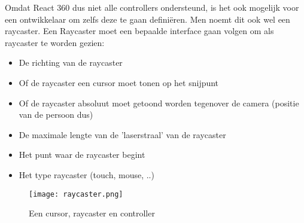 Omdat React 360 dus niet alle controllers ondersteund, is het ook mogelijk voor een ontwikkelaar om zelfs deze te gaan definiëren. Men noemt dit ook wel een raycaster. Een Raycaster moet een bepaalde interface gaan volgen om als raycaster te worden gezien:

\begin{itemize}
	\item De richting van de raycaster
	\item Of de raycaster een cursor moet tonen op het snijpunt
	\item Of de raycaster absoluut moet getoond worden tegenover de camera (positie van de persoon dus)
	\item De maximale lengte van de 'laserstraal' van de raycaster
	\item Het punt waar de raycaster begint
	\item Het type raycaster (touch, mouse, ..)
\end{itemize}

\begin{figure}[h]
	\centering
	\texttt{[image: raycaster.png]}
	\caption{Een cursor, raycaster en controller}
	\label{fig:raycaster}
\end{figure}